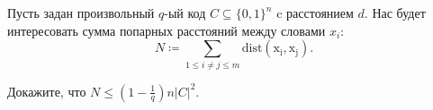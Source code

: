 Пусть задан произвольный $q$-ый код $C \subseteq \{0, 1\}^n$ c расстоянием $d$. Нас будет интересовать
сумма попарных расстояний между словами $x_i$:
$$N \coloneqq \sum\limits_{1 \le i \neq j \le m} \mathrm{dist(x_i, x_j)}.$$

Докажите, что $N \le (1 - \frac{1}{q}) n |C|^2$.
